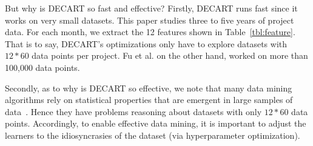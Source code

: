 \documentclass[sigconf,review,anonymous]{acmart}
\begin{document}
But why is DECART so fast and effective?
Firstly,  DECART runs fast since it works on   very small datasets. 
This paper studies three to five years of project data. For each month, we  extract the 12 features shown in  Table~\ref{tbl:feature}. That is to say,  DECART's optimizations only have to explore datasets with  $\mathit{12*60}$
 data points per project.
  Fu et al. on the other hand, worked on more than 100,000 data points.
 
 
Secondly, as to why is DECART so effective, we note that many data mining algorithms  rely on  statistical properties that are emergent in   large samples of data~\cite{witten11}. Hence they  
have problems reasoning about  datasets with only $\mathit{12*60}$ data points.  
Accordingly, to enable effective data mining,
it is important to adjust the learners to the   idiosyncrasies of the dataset 
(via hyperparameter optimization).
 
\end{document}
